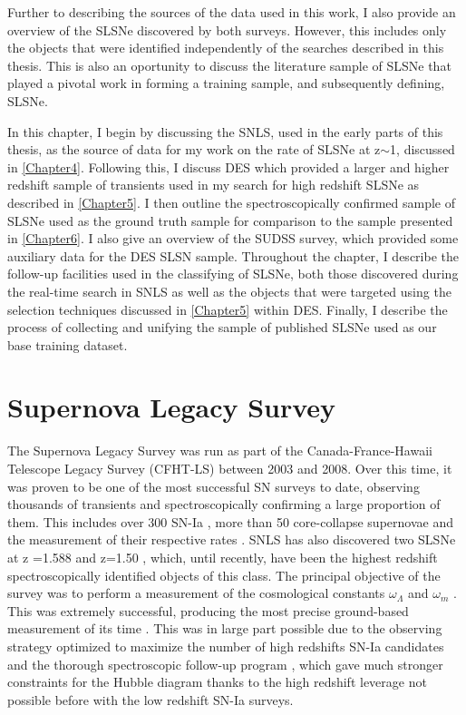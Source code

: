 Further to describing the sources of the data used in this work, I also provide an overview of the SLSNe discovered by both surveys. However, this includes only the objects that were identified independently of the searches described in this thesis. This is also an oportunity to discuss the literature sample of SLSNe that played a pivotal work in forming a training sample, and subsequently defining, SLSNe.

In this chapter, I begin by discussing the SNLS, used in the early parts of this thesis, as the source of data for my work on the rate of SLSNe at z$\sim$1, discussed in \cref{Chapter4}. Following this, I discuss DES which provided a larger and higher redshift sample of transients used in my search for high redshift SLSNe as described in \cref{Chapter5}. I then outline the spectroscopically confirmed sample of SLSNe used as the ground truth sample for comparison to the sample presented in \cref{Chapter6}. I also give an overview of the SUDSS survey, which provided some auxiliary data for the DES SLSN sample. Throughout the chapter, I describe the follow-up facilities used in the classifying of SLSNe, both those discovered during the real-time search in SNLS as well as the objects that were targeted using the selection techniques discussed in \cref{Chapter5} within DES. Finally, I describe the process of collecting and unifying the sample of published SLSNe used as our base training dataset.

\section{Supernova Legacy Survey}
The Supernova Legacy Survey \citep{Boulade2003,Pritchet2004} was run as part of the Canada-France-Hawaii Telescope Legacy Survey (CFHT-LS) between 2003 and 2008. Over this time, it was proven to be one of the most successful SN surveys to date, observing thousands of transients and spectroscopically confirming a large proportion of them. This includes over 300 SN-Ia \citep{Perrett2010}, more than 50 core-collapse supernovae and the measurement of their respective rates \citep{Perrett2012,Bazin2009}. SNLS has also discovered two SLSNe at z =1.588 and z=1.50 \citep{Howell2013}, which, until recently, have been the highest redshift spectroscopically identified objects of this class. The principal objective of the survey was to perform a measurement of the cosmological constants $\omega_{\Lambda}$ and $\omega_{m}$ \citep{Astier2006}. This was extremely successful, producing the most precise ground-based measurement of its time \citep{Sullivan2011}. This was in large part possible due to the observing strategy optimized to maximize the number of high redshifts SN-Ia candidates and the thorough spectroscopic follow-up program \citep{Bronder2007}, which gave much stronger constraints for the Hubble diagram thanks to the high redshift leverage not possible before with the low redshift SN-Ia surveys.

